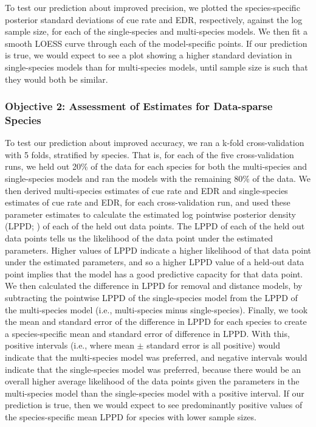 \documentclass[12pt]{article}
\begin{document}
\par To test our prediction about improved precision, we plotted the species-specific posterior standard deviations of cue rate and EDR, respectively, against the log sample size, for each of the single-species and multi-species models.
We then fit a smooth LOESS curve through each of the model-specific points.
If our prediction is true, we would expect to see a plot showing a higher standard deviation in single-species models than for multi-species models, until sample size is such that they would both be similar.

\subsubsection{Objective 2: Assessment of Estimates for Data-sparse Species}

\par To test our prediction about improved accuracy, we ran a k-fold cross-validation with 5 folds, stratified by species.
That is, for each of the five cross-validation runs, we held out 20\% of the data for each species for both the multi-species and single-species models and ran the models with the remaining 80\% of the data. 
We then derived multi-species estimates of cue rate and EDR and single-species estimates of cue rate and EDR, for each cross-validation run, and used these parameter estimates to calculate the estimated log pointwise posterior density (LPPD; \citet{gelman_understanding_2013}) of each of the held out data points. 
The LPPD of each of the held out data points tells us the likelihood of the data point under the estimated parameters.
Higher values of LPPD indicate a higher likelihood of that data point under the estimated parameters, and so a higher LPPD value of a held-out data point implies that the model has a good predictive capacity for that data point.
We then calculated the difference in LPPD for removal and distance models, by subtracting the pointwise LPPD of the single-species model from the LPPD of the multi-species model (i.e., multi-species minus single-species).
Finally, we took the mean and standard error of the difference in LPPD for each species to create a species-specific mean and standard error of difference in LPPD.
With this, positive intervals (i.e., where mean $\pm$ standard error is all positive) would indicate that the multi-species model was preferred, and negative intervals would indicate that the single-species model was preferred, because there would be an overall higher average likelihood of the data points given the parameters in the multi-species model than the single-species model with a positive interval.
If our prediction is true, then we would expect to see predominantly positive values of the species-specific mean LPPD for species with lower sample sizes.
\end{document}

